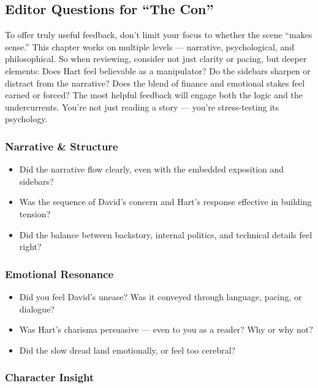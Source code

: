 \subsection{Editor Questions for ``The Con''}

To offer truly useful feedback, don’t limit your focus to whether the scene “makes sense.” This chapter works on multiple levels 
— narrative, psychological, and philosophical. So when reviewing, consider not just clarity or pacing, but deeper elements: Does 
Hart feel believable as a manipulator? Do the sidebars sharpen or distract from the narrative? Does the blend of finance and 
emotional stakes feel earned or forced? The most helpful feedback will engage both the logic and the undercurrents. You're not 
just reading a story — you're stress-testing its psychology.

\subsubsection{Narrative \& Structure}

\begin{itemize}
  \item Did the narrative flow clearly, even with the embedded exposition and sidebars?
  \item Was the sequence of David's concern and Hart’s response effective in building tension?
  \item Did the balance between backstory, internal politics, and technical details feel right?
\end{itemize}

\subsubsection{Emotional Resonance}

\begin{itemize}
  \item Did you feel David’s unease? Was it conveyed through language, pacing, or dialogue?
  \item Was Hart’s charisma persuasive — even to you as a reader? Why or why not?
  \item Did the slow dread land emotionally, or feel too cerebral?
\end{itemize}

\subsubsection{Character Insight}

